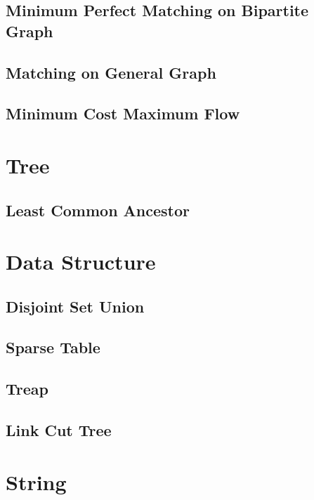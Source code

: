 \documentclass{article}
\begin{document}
\begin{multicols}{2}
    \subsection{Minimum Perfect Matching on Bipartite Graph}
    
    \subsection{Matching on General Graph}
    
    \subsection{Minimum Cost Maximum Flow}
    

    \section{Tree}
    \subsection{Least Common Ancestor}
    

    \section{Data Structure}
    \subsection{Disjoint Set Union}
    
    \subsection{Sparse Table}
    
    \subsection{Treap}
    
    \subsection{Link Cut Tree}
    

    \section{String}

\end{multicols}
\end{document}
